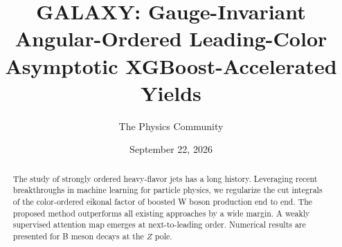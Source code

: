 \documentclass[11pt]{article}
\title{GALAXY: Gauge-Invariant Angular-Ordered Leading-Color Asymptotic XGBoost-Accelerated Yields}
\author{The Physics Community}
\date{September 22, 2026}
\numberwithin{equation}{section}
\theoremstyle{definition}
\theoremstyle{remark}
\begin{document}
\maketitle
\begin{abstract}
The study of strongly ordered heavy-flavor jets has a long history.
Leveraging recent breakthroughs in machine learning for particle
physics, we regularize the cut integrals of the color-ordered eikonal
factor of boosted W boson production end to end. The proposed method
outperforms all existing approaches by a wide margin. A weakly
supervised attention map emerges at next-to-leading order. Numerical
results are presented for B meson decays at the $Z$ pole.
\end{abstract}
\tableofcontents






\nocite{*}


\end{document}
